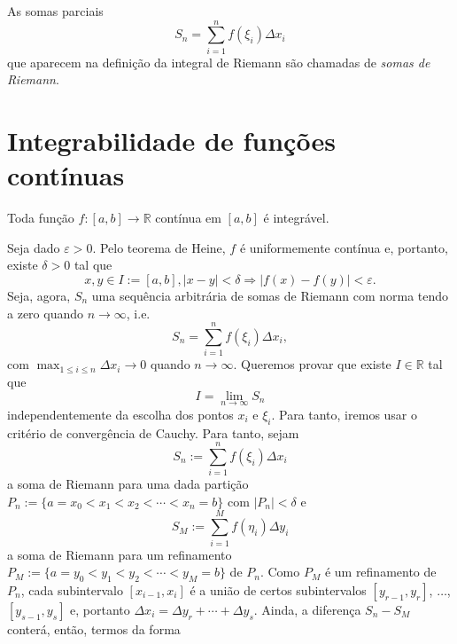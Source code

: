 \begin{obs}
  As somas parciais
  \begin{equation}
    S_n = \sum_{i=1}^n f(\xi_i)\Delta x_i
  \end{equation}
que aparecem na definição da integral de Riemann são chamadas de \emph{somas de Riemann}.
\end{obs}

\section{Integrabilidade de funções contínuas}

\begin{teo}
  Toda função $f:[a, b]\to\mathbb{R}$ contínua em $[a, b]$ é integrável.
\end{teo}
\begin{dem}
  Seja dado $\varepsilon>0$. Pelo teorema de Heine, $f$ é uniformemente contínua e, portanto, existe $\delta>0$ tal que
  \begin{equation}
    x,y\in I:=[a, b], |x-y|<\delta \Rightarrow |f(x)-f(y)|<\varepsilon.
  \end{equation}
Seja, agora, $S_n$ uma sequência arbitrária de somas de Riemann com norma tendo a zero quando $n\to\infty$, i.e.
\begin{equation}
  S_n = \sum_{i=1}^n f(\xi_i)\Delta x_i,
\end{equation}
com $\max_{1\leq i\leq n}\Delta x_i\to 0$ quando $n\to\infty$. Queremos provar que existe $I\in\mathbb{R}$ tal que
\begin{equation}
  I = \lim_{n\to\infty} S_n
\end{equation}
independentemente da escolha dos pontos $x_i$ e $\xi_i$. Para tanto, iremos usar o critério de convergência de Cauchy. Para tanto, sejam 
\begin{equation}
  S_n := \sum_{i=1}^n f(\xi_i)\Delta x_i
\end{equation}
a soma de Riemann para uma dada partição $P_n := \{a=x_0<x_1<x_2<\cdots <x_n=b\}$ com $|P_n| < \delta$ e 
\begin{equation}
  S_M := \sum_{i=1}^M f(\eta_i)\Delta y_i
\end{equation}
a soma de Riemann para um refinamento $P_M:=\{a=y_0<y_1<y_2<\cdots <y_M=b\}$ de $P_n$. Como $P_M$ é um refinamento de $P_n$, cada subintervalo $[x_{i-1}, x_i]$ é a união de certos subintervalos $[y_{r-1}, y_{r}]$, $\ldots$, $[y_{s-1}, y_{s}]$ e, portanto $\Delta x_i = \Delta y_r + \cdots + \Delta y_s$. Ainda, a diferença $S_n - S_M$ conterá, então, termos da forma

\end{dem}
